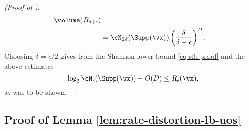 \documentclass[../../book-main.tex]{subfiles}
\begin{document}
\begin{proof}[(Proof of )]
\begin{align}
{        }
        {
            \volume(B_{\delta + \epsilon})
        }
        \\
        &=
        \cN_{2\delta}(\Supp(\vx))
        \left(
            \frac{
                \delta
            } 
            {
                \delta + \epsilon
            }
        \right)^D.
    \end{align}
    Choosing $\delta = \epsilon / 2$ gives from the Shannon lower bound
    \eqref{eq:slb-proof} and the above estimates
    \begin{equation}
        \log_2 \cN_{\epsilon}(\Supp(\vx))
        - O(D)
        \leq
        R_{\epsilon}(\vx),
    \end{equation}
    as was to be shown.

\end{proof}



\subsection{Proof of Lemma \ref{lem:rate-distortion-lb-uos}}\label{sec:app-rate-dist-deferred-proofs}
\end{document}

